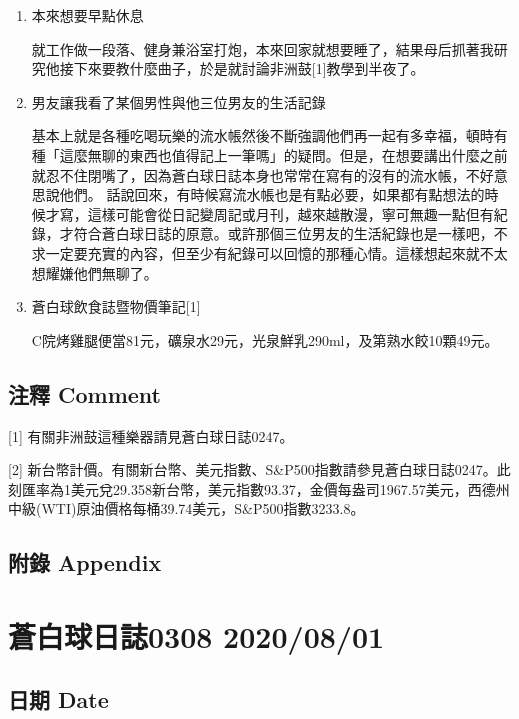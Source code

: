 \documentclass[a5paper, 11pt
]{book}
\begin{document}
\begin{enumerate}
\def\labelenumi{\arabic{enumi}.}
\item
  本來想要早點休息

  就工作做一段落、健身兼浴室打炮，本來回家就想要睡了，結果母后抓著我研究他接下來要教什麼曲子，於是就討論非洲鼓{[}1{]}教學到半夜了。
\item
  男友讓我看了某個男性與他三位男友的生活記錄

  基本上就是各種吃喝玩樂的流水帳然後不斷強調他們再一起有多幸福，頓時有種「這麼無聊的東西也值得記上一筆嗎」的疑問。但是，在想要講出什麼之前就忍不住閉嘴了，因為蒼白球日誌本身也常常在寫有的沒有的流水帳，不好意思說他們。
  話說回來，有時候寫流水帳也是有點必要，如果都有點想法的時候才寫，這樣可能會從日記變周記或月刊，越來越散漫，寧可無趣一點但有紀錄，才符合蒼白球日誌的原意。或許那個三位男友的生活紀錄也是一樣吧，不求一定要充實的內容，但至少有紀錄可以回憶的那種心情。這樣想起來就不太想耀嫌他們無聊了。
\item
  蒼白球飲食誌暨物價筆記{[}1{]}

  C院烤雞腿便當81元，礦泉水29元，光泉鮮乳290ml，及第熟水餃10顆49元。
\end{enumerate}

\hypertarget{ux6ce8ux91cb-comment-60}{%
\subsection{注釋 Comment}\label{ux6ce8ux91cb-comment-60}}

{[}1{]} 有關非洲鼓這種樂器請見蒼白球日誌0247。

{[}2{]}
新台幣計價。有關新台幣、美元指數、S\&P500指數請參見蒼白球日誌0247。此刻匯率為1美元兌29.358新台幣，美元指數93.37，金價每盎司1967.57美元，西德州中級(WTI)原油價格每桶39.74美元，S\&P500指數3233.8。

\hypertarget{ux9644ux9304-appendix-60}{%
\subsection{附錄 Appendix}\label{ux9644ux9304-appendix-60}}

\hypertarget{ux84bcux767dux7403ux65e5ux8a8c0308-20200801}{%
\section{蒼白球日誌0308
2020/08/01}\label{ux84bcux767dux7403ux65e5ux8a8c0308-20200801}}

\hypertarget{ux65e5ux671f-date-61}{%
\subsection{日期 Date}\label{ux65e5ux671f-date-61}}
\end{document}
